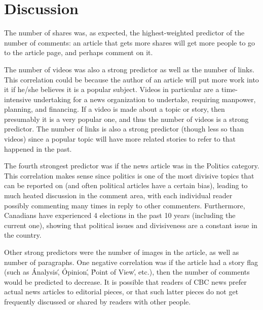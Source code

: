 \documentclass[conference,compsoc]{IEEEtran}
\begin{document}
\section{Discussion}

The number of shares was, as expected, the highest-weighted predictor of the number of comments: an article that gets more shares will get more people to go to the article page, and perhaps comment on it.

The number of videos was also a strong predictor as well as the number of links. This correlation could be because the author of an article will put more work into it if he/she believes it is a popular subject. Videos in particular are a time-intensive undertaking for a news organization to undertake, requiring manpower, planning, and financing. If a video is made about a topic or story, then presumably it is a very popular one, and thus the number of videos is a strong predictor. The number of links is also a strong predictor (though less so than videos) since a popular topic will have more related stories to refer to that happened in the past.

The fourth strongest predictor was if the news article was in the Politics category. This correlation makes sense since politics is one of the most divisive topics that can be reported on (and often political articles have a certain bias), leading to much heated discussion in the comment area, with each individual reader possibly commenting many times in reply to other commenters. Furthermore, Canadians have experienced 4 elections in the past 10 years (including the current one), showing that political issues and divisiveness are a constant issue in the country.

Other strong predictors were the number of images in the article, as well as number of paragraphs. One negative correlation was if the article had a story flag (such as \'Analysis\', \'Opinion\', \'Point of View\', etc.), then the number of comments would be predicted to decrease. It is possible that readers of CBC news prefer  actual news articles to editorial pieces, or that such latter pieces do not get frequently discussed or shared by readers with other people.
\end{document}
